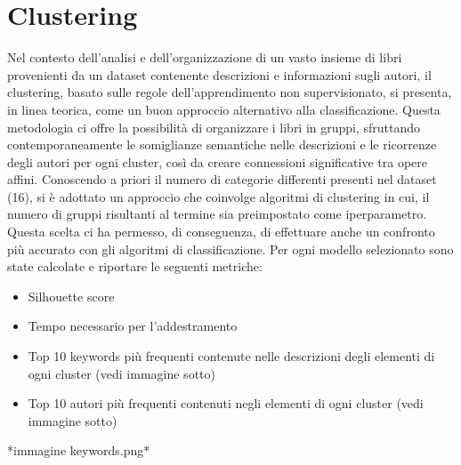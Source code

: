 \documentclass[12pt,oneside]{article}
\begin{document}
\section{Clustering}
    \begin{justify}
        Nel contesto dell'analisi e dell'organizzazione di un vasto insieme di libri provenienti da un dataset contenente descrizioni e informazioni sugli autori, il clustering, basato sulle regole dell'apprendimento non supervisionato, si presenta, in linea teorica, come un buon approccio alternativo alla classificazione. Questa metodologia ci offre la possibilità di organizzare i libri in gruppi, sfruttando contemporaneamente le somiglianze semantiche nelle descrizioni e le ricorrenze degli autori per ogni cluster, così da creare connessioni significative tra opere affini. Conoscendo a priori il numero di categorie differenti presenti nel dataset (16), si è adottato un approccio che coinvolge algoritmi di clustering in cui, il numero di gruppi risultanti al termine sia preimpostato come iperparametro. Questa scelta ci ha permesso, di conseguenza, di effettuare anche un confronto più accurato con gli algoritmi di classificazione.
        Per ogni modello selezionato sono state calcolate e riportare le seguenti metriche:
        \begin{itemize}
            \item Silhouette score
            \item Tempo necessario per l’addestramento
            \item Top 10 keywords più frequenti contenute nelle descrizioni degli elementi di ogni cluster (vedi immagine sotto)
            \item Top 10 autori più frequenti contenuti negli elementi di ogni cluster (vedi immagine sotto)
        \end{itemize}
        *immagine keywords.png*
    \end{justify}
\end{document}
